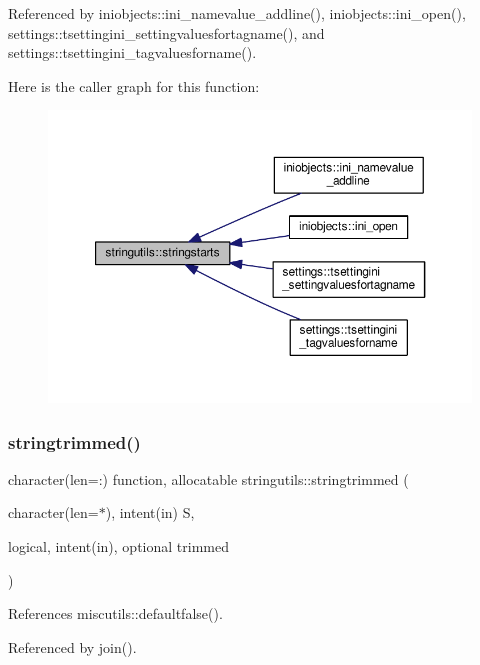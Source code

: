 Referenced by iniobjects\+::ini\+\_\+namevalue\+\_\+addline(), iniobjects\+::ini\+\_\+open(), settings\+::tsettingini\+\_\+settingvaluesfortagname(), and settings\+::tsettingini\+\_\+tagvaluesforname().

Here is the caller graph for this function\+:
\nopagebreak
\begin{figure}[H]
\begin{center}
\leavevmode
\includegraphics[width=350pt]{namespacestringutils_a83f80ac2eecd8ff5e8fd18faba396ec9_icgraph}
\end{center}
\end{figure}
\mbox{\label{namespacestringutils_ac5e67eb0a4de77625ac1447804e1f934}} 
\subsubsection{\texorpdfstring{stringtrimmed()}{stringtrimmed()}}
{\footnotesize\ttfamily character(len=\+:) function, allocatable stringutils\+::stringtrimmed (\begin{DoxyParamCaption}\item[{character(len=$\ast$), intent(in)}]{S,  }\item[{logical, intent(in), optional}]{trimmed }\end{DoxyParamCaption})}



References miscutils\+::defaultfalse().



Referenced by join().

